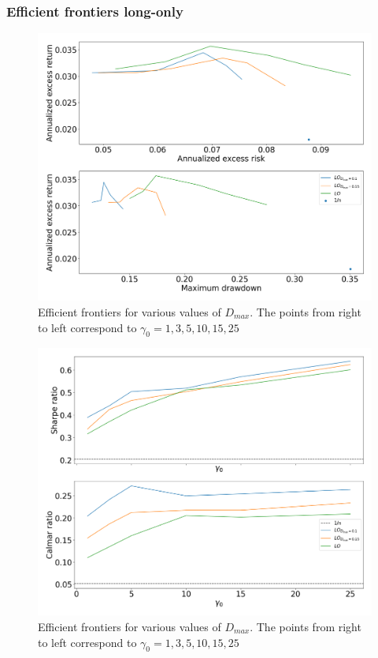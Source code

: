 \subsubsection*{Efficient frontiers long-only}

\begin{figure}[H]
    \centering
    \includegraphics[width=1\textwidth]{analysis/portfolio_exercise/images/mle/frontier_lo.png}
    \caption[Efficient frontiers for various values of $D_{max}$]{Efficient frontiers for various values of $D_{max}$. The points from right to left correspond to $\gamma_0=1,3,5,10,15,25$}
    \label{fig:MPC_frontier_lo}
\end{figure}

\begin{figure}[H]
    \centering
    \includegraphics[width=1\textwidth]{analysis/portfolio_exercise/images/mle/sharpe_frontier_lo.png}
    \caption[Efficient frontiers for various values of $D_{max}$]{Efficient frontiers for various values of $D_{max}$. The points from right to left correspond to $\gamma_0=1,3,5,10,15,25$}
    \label{fig:MPC_sharpe_frontier_lo}
\end{figure}

